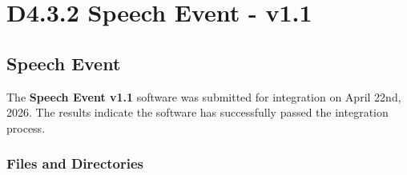 \documentclass{CSSRforAfrica}
\begin{document}


\section{D4.3.2 Speech Event - v1.1}
\subsection{Speech Event} 
\label{subsection:speech_event}
The \textbf{Speech Event v1.1} software was submitted for integration on April 22nd, 2026. The results indicate the software has successfully passed the integration process. 

\subsubsection{Files and Directories}
 
\end{document}

